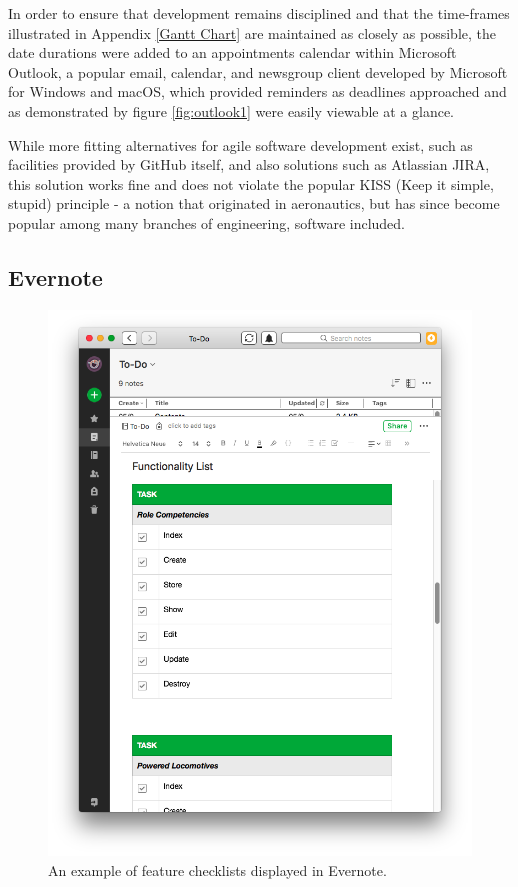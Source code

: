 In order to ensure that development remains disciplined and that the time-frames illustrated in Appendix \ref{Gantt Chart} are maintained as closely as possible, the date durations were added to an appointments calendar within Microsoft Outlook, a popular email, calendar, and newsgroup client developed by Microsoft for Windows and macOS, \cite{Microsoft1} which provided reminders as deadlines approached and as demonstrated by figure \ref{fig:outlook1} were easily viewable at a glance.

While more fitting alternatives for agile software development exist, such as facilities provided by GitHub itself, and also solutions such as Atlassian JIRA, this solution works fine and does not violate the popular KISS (Keep it simple, stupid) principle - a notion that originated in aeronautics, but has since become popular among many branches of engineering, software included. \cite{Branson1}

\subsection{Evernote}
\begin{figure}[!ht]
    \includegraphics[width=\textwidth]{Figures/evernote}
    \caption{An example of feature checklists displayed in Evernote.}
    \label{fig:evernote1}
\end{figure}

